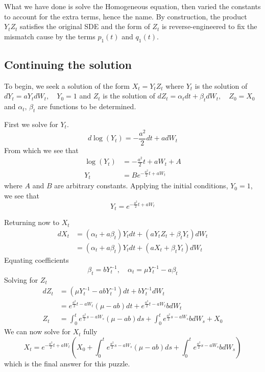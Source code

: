\documentclass[12pt]{article}
\begin{document}
What we have done is solve the Homogeneous equation, then varied the constants to account for the extra terms, hence the name. By construction, the product \(Y_tZ_t\) satisfies the original SDE and the form of \(Z_t\) is reverse-engineered to fix the mismatch cause by the terms \(p_1(t)\) and \(q_1(t)\).

\subsection*{Continuing the solution}

To begin, we seek a solution of the form \(X_t = Y_t Z_t\) where \(Y_t\) is the solution of \(dY_t = aY_tdW_t, \quad Y_0 = 1\) and \(Z_t\) is the solution of \(dZ_t = \alpha_tdt + \beta_tdW_t, \quad Z_0 = X_0\) and \(\alpha_t,\,\beta_t\) are functions to be determined.

First we solve for \(Y_t\).
\[
d\log(Y_t) = -\frac{a^2}{2}dt + adW_t
\]
From which we see that
\begin{align*}
    \log(Y_t) &= -\frac{a^2}{2}t + aW_t + A\\
    Y_t &= Be^{-\frac{a^2}{2}t + aW_t}
\end{align*}
where $A$ and $B$ are arbitrary constants. Applying the initial conditions, \(Y_0 = 1\), we see that
\[
Y_t = e^{-\frac{a^2}{2}t + aW_t}
\]

Returning now to \(X_t\)
\begin{align*}
dX_t &= \left(\alpha_t + a\beta_t\right)Y_tdt + \left(aY_tZ_t + \beta_tY_t\right)dW_t\\
&= \left(\alpha_t + a\beta_t\right)Y_tdt + \left(aX_t + \beta_tY_t\right)dW_t
\end{align*}
Equating coefficients
\[
\beta_t = bY_t^{-1},\quad \alpha_t = \mu Y_t^{-1} - a\beta_t
\]
Solving for \(Z_t\)
\begin{align*}
    dZ_t &= \left(\mu Y_t^{-1} - abY_t^{-1}\right)dt + bY_t^{-1}dW_t\\
    &= e^{\frac{a^2}{2}t - aW_t}\left(\mu - ab\right)dt + e^{\frac{a^2}{2}t - aW_t}bdW_t\\
    Z_t &= \int_0^te^{\frac{a^2}{2}s - aW_s}\left(\mu - ab\right)ds + \int_0^te^{\frac{a^2}{2}s - aW_s}bdW_s + X_0
\end{align*}
We can now solve for \(X_t\) fully
\[
\boxed{
X_t = e^{-\frac{a^2}{2}t + aW_t}\left(X_0 + \int_0^te^{\frac{a^2}{2}s - aW_s}\left(\mu - ab\right)ds + \int_0^te^{\frac{a^2}{2}s - aW_s}bdW_s\right)
}
\]
which is the final answer for this puzzle.
\end{document}
